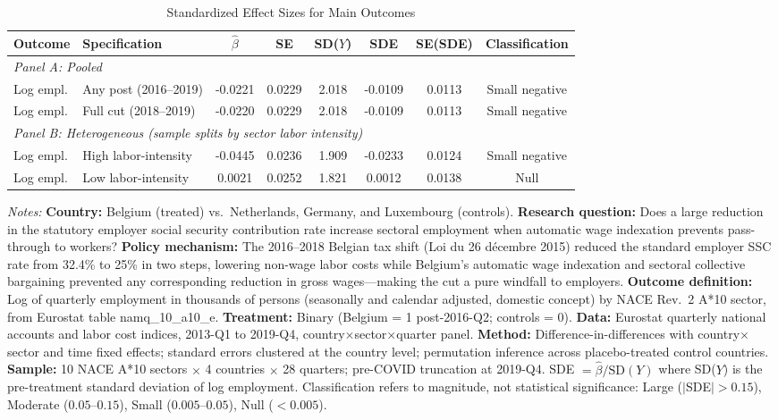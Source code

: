 \begin{table}[H]
\centering
\caption{Standardized Effect Sizes for Main Outcomes}
\label{tab:sde}
\begin{threeparttable}
\footnotesize
\begin{tabular}{llcccccc}
\toprule
Outcome & Specification & $\hat{\beta}$ & SE & SD($Y$) & SDE & SE(SDE) & Classification \\
\midrule
\multicolumn{8}{l}{\textit{Panel A: Pooled}} \\
Log empl. & Any post (2016--2019) & -0.0221 & 0.0229 & 2.018 & -0.0109 & 0.0113 & Small negative \\
Log empl. & Full cut (2018--2019) & -0.0220 & 0.0229 & 2.018 & -0.0109 & 0.0113 & Small negative \\
\midrule
\multicolumn{8}{l}{\textit{Panel B: Heterogeneous (sample splits by sector labor intensity)}} \\
Log empl. & High labor-intensity & -0.0445 & 0.0236 & 1.909 & -0.0233 & 0.0124 & Small negative \\
Log empl. & Low labor-intensity & 0.0021 & 0.0252 & 1.821 & 0.0012 & 0.0138 & Null \\
\bottomrule
\end{tabular}
\begin{tablenotes}[flushleft]
\small
\item \textit{Notes:} \textbf{Country:} Belgium (treated) vs.\ Netherlands, Germany, and Luxembourg (controls). \textbf{Research question:} Does a large reduction in the statutory employer social security contribution rate increase sectoral employment when automatic wage indexation prevents pass-through to workers? \textbf{Policy mechanism:} The 2016--2018 Belgian tax shift (Loi du 26 d\'{e}cembre 2015) reduced the standard employer SSC rate from 32.4\%{} to 25\%{} in two steps, lowering non-wage labor costs while Belgium's automatic wage indexation and sectoral collective bargaining prevented any corresponding reduction in gross wages---making the cut a pure windfall to employers. \textbf{Outcome definition:} Log of quarterly employment in thousands of persons (seasonally and calendar adjusted, domestic concept) by NACE Rev.~2 A*10 sector, from Eurostat table namq\_10\_a10\_e. \textbf{Treatment:} Binary (Belgium = 1 post-2016-Q2; controls = 0). \textbf{Data:} Eurostat quarterly national accounts and labor cost indices, 2013-Q1 to 2019-Q4, country$\times$sector$\times$quarter panel. \textbf{Method:} Difference-in-differences with country$\times$sector and time fixed effects; standard errors clustered at the country level; permutation inference across placebo-treated control countries. \textbf{Sample:} 10 NACE A*10 sectors $\times$ 4 countries $\times$ 28 quarters; pre-COVID truncation at 2019-Q4. SDE $= \hat{\beta} / \text{SD}(Y)$ where SD($Y$) is the pre-treatment standard deviation of log employment. Classification refers to magnitude, not statistical significance: Large ($|$SDE$| > 0.15$), Moderate ($0.05$--$0.15$), Small ($0.005$--$0.05$), Null ($< 0.005$).
\end{tablenotes}
\end{threeparttable}
\end{table}
